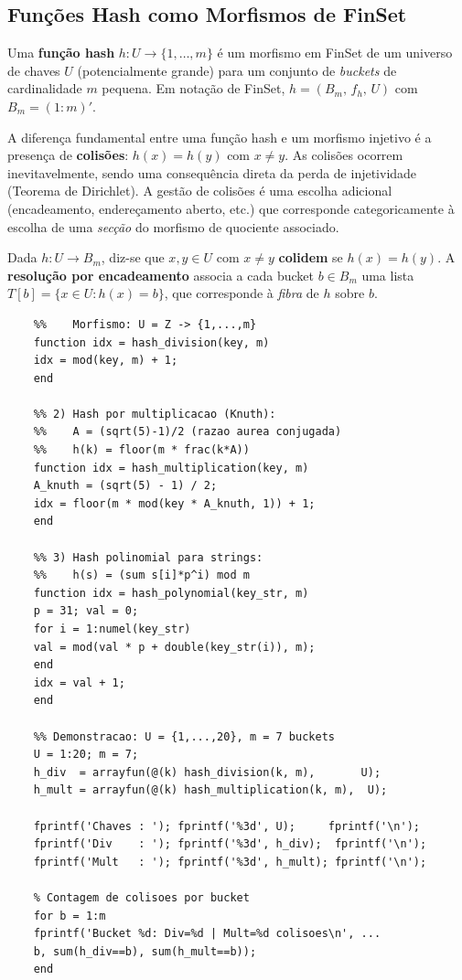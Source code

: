 \subsection{Funções Hash como Morfismos de FinSet}

\begin{definition}
	Uma \textbf{função hash} $h: U \to \{1,\ldots,m\}$ é um morfismo
	em FinSet de um universo de chaves $U$ (potencialmente grande)
	para um conjunto de \emph{buckets} de cardinalidade $m$ pequena.
	Em notação de FinSet, $h = (B_m,\, f_h,\, U)$ com
	$B_m = (1:m)'$.
\end{definition}

A diferença fundamental entre uma função hash e um morfismo
injetivo é a presença de \textbf{colisões}: $h(x) = h(y)$
com $x \neq y$. As colisões ocorrem inevitavelmente, sendo uma
consequência direta da perda de injetividade (Teorema de Dirichlet).
A gestão de colisões é uma escolha adicional (encadeamento,
endereçamento aberto, etc.) que corresponde categoricamente à
escolha de uma \emph{secção} do morfismo de quociente associado.

\begin{definition}
	Dada $h: U \to B_m$, diz-se que $x, y \in U$ com $x \neq y$
	\textbf{colidem} se $h(x) = h(y)$.
	A \textbf{resolução por encadeamento} associa a cada bucket
	$b \in B_m$ uma lista $T[b] = \{x \in U : h(x) = b\}$,
	que corresponde à \emph{fibra} de $h$ sobre $b$.
\end{definition}

\begin{lstlisting}[style=matlab, caption={Três famílias de funções hash como morfismos de FinSet}]
	%% 1) Hash por divisao: h(k) = mod(k,m) + 1
	%%    Morfismo: U = Z -> {1,...,m}
	function idx = hash_division(key, m)
	idx = mod(key, m) + 1;
	end
	
	%% 2) Hash por multiplicacao (Knuth):
	%%    A = (sqrt(5)-1)/2 (razao aurea conjugada)
	%%    h(k) = floor(m * frac(k*A))
	function idx = hash_multiplication(key, m)
	A_knuth = (sqrt(5) - 1) / 2;
	idx = floor(m * mod(key * A_knuth, 1)) + 1;
	end
	
	%% 3) Hash polinomial para strings:
	%%    h(s) = (sum s[i]*p^i) mod m
	function idx = hash_polynomial(key_str, m)
	p = 31; val = 0;
	for i = 1:numel(key_str)
	val = mod(val * p + double(key_str(i)), m);
	end
	idx = val + 1;
	end
	
	%% Demonstracao: U = {1,...,20}, m = 7 buckets
	U = 1:20; m = 7;
	h_div  = arrayfun(@(k) hash_division(k, m),       U);
	h_mult = arrayfun(@(k) hash_multiplication(k, m),  U);
	
	fprintf('Chaves : '); fprintf('%3d', U);     fprintf('\n');
	fprintf('Div    : '); fprintf('%3d', h_div);  fprintf('\n');
	fprintf('Mult   : '); fprintf('%3d', h_mult); fprintf('\n');
	
	% Contagem de colisoes por bucket
	for b = 1:m
	fprintf('Bucket %d: Div=%d | Mult=%d colisoes\n', ...
	b, sum(h_div==b), sum(h_mult==b));
	end
\end{lstlisting}

